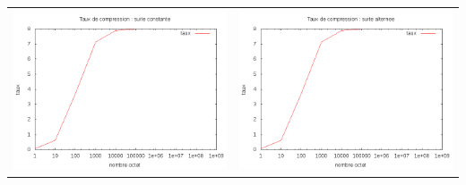 \documentclass{report}
\begin{document}
\subparagraph*{}
\hspace{-2cm}\begin{tabular}{l | l}
\includegraphics[width=7cm]{HConstant.png} & 
\includegraphics[width=7cm]{alternerH.png} 
\end{tabular}
\end{document}
